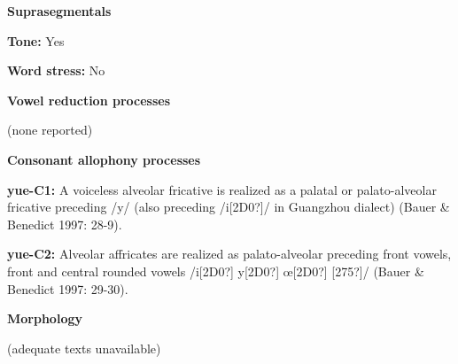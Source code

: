 \begin{styleBody}
\textbf{Suprasegmentals}
\end{styleBody}

\begin{styleBody}
\textbf{Tone: }Yes
\end{styleBody}

\begin{styleBody}
\textbf{Word stress: }No
\end{styleBody}

\begin{styleBody}
\textbf{Vowel reduction processes}
\end{styleBody}

\begin{styleBody}
(none reported)
\end{styleBody}

\begin{styleBody}
\textbf{Consonant allophony processes}
\end{styleBody}

\begin{styleBody}
\textbf{yue-C1: }A voiceless alveolar fricative is realized as a palatal or palato-alveolar fricative preceding /y/ (also preceding /i[2D0?]/ in Guangzhou dialect) (Bauer \& Benedict 1997: 28-9).
\end{styleBody}

\begin{styleBody}
\textbf{yue-C2: }Alveolar affricates are realized as palato-alveolar preceding front vowels, front and central rounded vowels /i[2D0?] y[2D0?] œ[2D0?] [275?]/ (Bauer \& Benedict 1997: 29-30).
\end{styleBody}

\begin{styleBody}
\textbf{Morphology}
\end{styleBody}

\begin{styleBody}
(adequate texts unavailable)
\end{styleBody}
